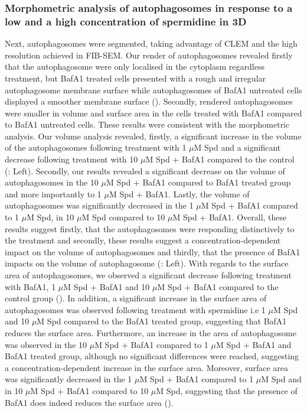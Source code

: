 \subsubsection{Morphometric analysis of autophagosomes in response to a low and a high concentration of spermidine in 3D}
Next, autophagosomes were segmented, taking advantage of CLEM and the high resolution achieved in FIB-SEM. Our render of autophagosomes revealed firstly that the autophagosome were only localised in the cytoplasm regardless treatment, but BafA1 treated cells presented with a rough and irregular autophagosome membrane surface while autophagosomes of BafA1 untreated cells displayed a smoother membrane surface (). Secondly, rendered autophagosomes were smaller in volume and surface area in the cells treated with BafA1 compared to BafA1 untreated cells. These results were consistent with the morphometric analysis. Our volume analysis revealed, firstly, a significant increase in the volume of the autophagosomes following treatment with 1 $\mu$M Spd and a significant decrease following treatment with 10 $\mu$M Spd + BafA1 compared to the control (: Left). Secondly, our results revealed a significant decrease on the volume of autophagosomes in the 10 $\mu$M Spd + BafA1 compared to BafA1 treated group and more importantly to 1 $\mu$M Spd + BafA1. Lastly, the volume of autophagosomes was significantly decreased in the 1 $\mu$M Spd + BafA1 compared to 1 $\mu$M Spd, in 10 $\mu$M Spd compared to 10 $\mu$M Spd + BafA1. Overall, these results suggest firstly, that the autophagosomes were responding distinctively to the treatment and secondly, these results suggest a concentration-dependent impact on the volume of autophagosomes and thirdly, that the presence of BafA1 impacts on the volume of autophagosome (: Left). With regards to the surface area of autophagosomes, we observed a significant decrease following treatment with BafA1, 1 $\mu$M Spd + BafA1 and 10 $\mu$M Spd + BafA1 compared to the control group (). In addition, a significant increase in the surface area of autophagosomes was observed following treatment with spermidine i.e 1 $\mu$M Spd and 10 $\mu$M Spd compared to the BafA1 treated group, suggesting that BafA1 reduces the surface area. Furthermore, an increase in the area of autophagosome was observed in the 10 $\mu$M Spd + BafA1 compared to 1 $\mu$M Spd + BafA1 and BafA1 treated group, although no significant differences were reached, suggesting a concentration-dependent increase in the surface area. Moreover, surface area was significantly decreased in the 1 $\mu$M Spd + BafA1 compared to 1 $\mu$M Spd and in 10 $\mu$M Spd + BafA1 compared to 10 $\mu$M Spd, suggesting that the presence of BafA1 does indeed reduces the surface area (). 

